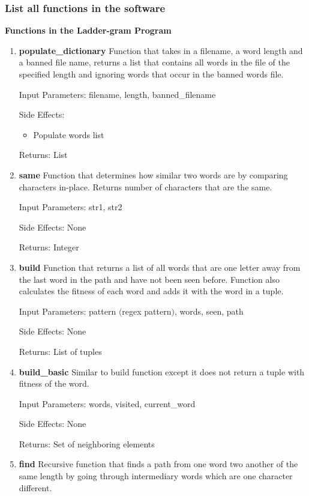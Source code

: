 \documentclass[12pt, a4]{report}
\begin{document}
	\subsubsection{List all functions in the software}
	\textbf{	Functions in the Ladder-gram Program}
	\begin{enumerate}
		\item
			\textbf{populate\_dictionary}
			\textbar{}  Function that takes in a filename, a word length and a banned file name, returns a list that contains all words in the file of the specified length and ignoring words that occur in the banned words file.
			\par Input Parameters: filename, length, banned\_filename 
			\par Side Effects:
			\begin{itemize}
				\item Populate words list
			\end{itemize}
			\par Returns: List
		\item
			\textbf{same}
			\textbar{}  Function that determines how similar two words are by comparing characters in-place. Returns number of characters that are the same.
			\par Input Parameters: str1, str2
			\par Side Effects: None
			\par Returns: Integer
		\item
			\textbf{build}
			\textbar{}  Function that returns a list of all words that are one letter away from the last word in the path and have not been seen before.
			    Function also calculates the fitness of each word and adds it with the word in a tuple.
			\par Input Parameters: pattern $($regex pattern$)$, words, seen, path
			\par Side Effects: None
			\par Returns: List of tuples
		\item 
			\textbf{build\_basic}
			\textbar{} Similar to build function except it does not return a tuple with fitness of the word.  
			\par Input Parameters: words, visited, current\_word 
			\par Side Effects: None 
			\par Returns: Set of neighboring elements 
		\item
			\textbf{find}
			\textbar{}  Recursive function that finds a path from one word two another of the same length by going through intermediary words which are one character different.

\end{enumerate}
\end{document}
